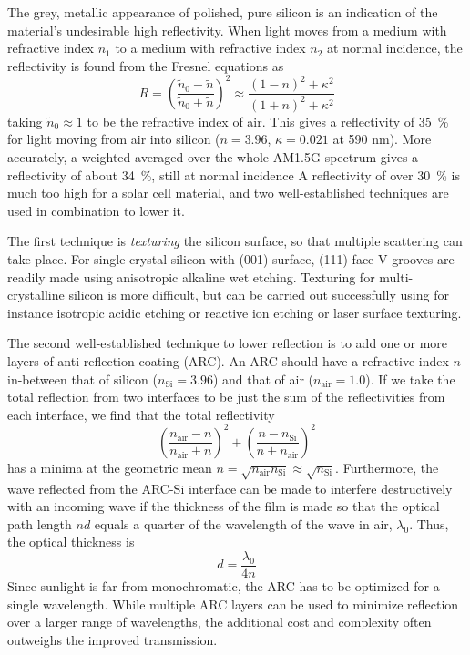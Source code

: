 \documentclass[11pt,bibliography=totoc,index=totoc]{scrbook}   %
\begin{document}
The grey, metallic appearance of polished, pure silicon is an indication of the material's undesirable high reflectivity.
When light moves from a medium with refractive index $n_1$ to a medium with refractive index $n_2$ at normal incidence, 
the reflectivity is found from the Fresnel equations as
\begin{equation}
    R = \left(\frac{\tilde{n}_0-\tilde{n}}{\tilde{n}_0+\tilde{n}}\right)^2 \approx
    \frac{(1 - n)^2 + \kappa^2}{(1 + n)^2 + \kappa^2}
  \label{eq:reflectivity}
\end{equation}
taking $\tilde{n}_0\approx 1$ to be the refractive index of air.
This gives a reflectivity of 35~\% for light moving from air into silicon ($n=3.96$, $\kappa=0.021$ at 590 nm\cite{www:refractiveindex-Si}).
More accurately, a weighted averaged over the whole AM1.5G spectrum gives a reflectivity of about 34~\%, still at normal incidence\cite{Macdonald:2004}
A reflectivity of over 30~\% is much too high for a solar cell material, and
two well-established techniques are used in combination to lower it.

The first technique is \emph{texturing} the silicon surface, so that multiple scattering can take place.
For single crystal silicon with (001) surface, (111) face V-grooves are readily made using anisotropic alkaline wet etching.
Texturing for multi-crystalline silicon is more difficult, but can be carried out successfully using for instance
isotropic acidic etching or reactive ion etching\cite{Macdonald:2004,Panek:2005,Koynov:2006} or laser surface texturing\cite{Iyengar:2010}.

The second well-established technique to lower reflection is to add one or more layers of anti-reflection coating (ARC). 
An ARC should have a refractive index $n$ in-between that of silicon ($n_{\text{Si}}=3.96$) and that of air ($n_{\text{air}}=1.0$).
If we take the total reflection from two interfaces to be just the sum of the reflectivities from each interface, we find that
the total reflectivity
\begin{equation}
    \left(\frac{n_{\text{air}}-n}{n_{\text{air}}+n}\right)^2 + \left(\frac{n-n_{\text{Si}}}{n+n_{\text{air}}}\right)^2 
\end{equation}
has a minima at the geometric mean $n=\sqrt{n_{\text{air}}n_{\text{Si}}} \approx \sqrt{n_{\text{Si}}}$.
Furthermore, the wave reflected from the ARC-Si interface can be made to interfere destructively with an incoming wave if
the thickness of the film is made so that the optical path length $nd$ equals a quarter of the wavelength of the wave in air, $\lambda_0$.
Thus, the optical thickness is
\begin{equation}
  d = \frac{\lambda_0}{4n}
\end{equation}
Since sunlight is far from monochromatic, the ARC has to be optimized for a single wavelength.
While multiple ARC layers can be used to minimize reflection over a larger range of wavelengths, 
the additional cost and complexity often outweighs the improved transmission.
\end{document}
